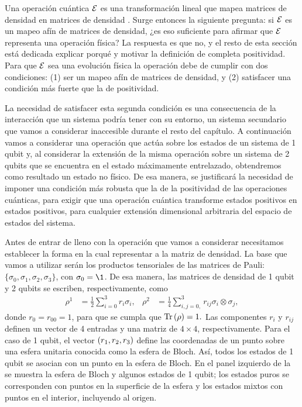 Una operación cuántica $\mathcal{E}$ es
una transformación lineal que mapea matrices de densidad en matrices 
de densidad \cite{bengtsson_zyczkowski_2017}. Surge entonces la siguiente
pregunta: si $\mathcal{E}$ es un mapeo afín de matrices de densidad, ¿es eso
suficiente para afirmar que $\mathcal{E}$ representa una operación física? 
La respuesta es que no, y el resto de esta sección está dedicada
explicar porqué y motivar la definición de completa positividad.  
Para que $\mathcal{E}$ sea una evolución física la operación debe de cumplir con dos
condiciones: (1) ser un mapeo afín de matrices de densidad, 
y (2) satisfacer una condición más fuerte que la de positividad. 

La necesidad de satisfacer esta segunda condición
es una consecuencia de la interacción que un sistema podría tener
con su entorno, un sistema secundario que vamos 
a considerar inaccesible durante el resto del capítulo.
A continuación vamos a considerar una operación 
que actúa sobre los estados de un sistema de
1 qubit y, al considerar la extensión de la misma operación
sobre un sistema de 2 qubits que se encuentra en
el estado máximamente entrelazado,
obtendremos como resultado un estado no físico.
De esa manera, se justificará la necesidad de imponer 
una condición más robusta que la de la positividad 
de las operaciones cuánticas, para exigir 
que una operación cuántica transforme estados 
positivos en estados positivos, para cualquier
extensión dimensional arbitraria del espacio
de estados del sistema.

Antes de entrar de lleno con la operación que vamos 
a considerar necesitamos establecer la forma en la 
cual representar a la matriz de densidad. La base
que vamos a utilizar serán los productos tensoriales de
las matrices de Pauli: $\{ \sigma_0, \sigma_1, \sigma_2, \sigma_3\}$,
con $\sigma_0=\1$. De esa manera, las matrices de 
densidad de 1 qubit y 2 qubits se escriben, 
respectivamente, como~\cite{nielsen_chuang_2011}
\begin{align}
\rho^1&=\frac{1}{2}\sum_{i=0}^{3} r_i\sigma_i,
& 
\rho^2&=\frac{1}{4}\sum _{i,j=0, }^{3}r_{ij}\sigma_i\otimes\sigma_j,
\label{eq:DM-1q}
\end{align}
donde $r_0=r_{00}=1$, para que se cumpla que $\Tr\qty(\rho)=1.$
Las componentes $r_i$ y $r_{ij}$ definen un vector de 4 entradas
y una matriz de $4\times4$, respectivamente. 
Para el caso de 1 qubit, el vector $\qty(r_1, r_2, r_3)$ define 
las coordenadas de un punto sobre una esfera unitaria conocida
como la esfera de Bloch.
Así, todos los estados de 1 qubit se asocian con un punto en la
esfera de Bloch. En el panel izquierdo de la 
 se muestra la esfera de Bloch
y algunos estados de 1 qubit; los estados puros se corresponden
con puntos en la superficie de la esfera y los estados mixtos 
con puntos en el interior, incluyendo al origen.

